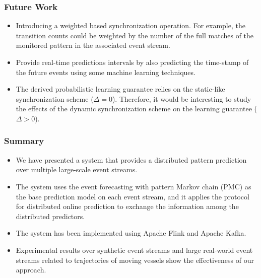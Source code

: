\begin{frame}
	
	\frametitle{Future Work}
	\begin{itemize}
		\item<1-> Introducing a weighted based synchronization operation. For example, the transition counts could be weighted by the number of the full matches of the monitored pattern in the associated event stream. 
		
		\item<1->Provide real-time predictions intervals by also predicting the time-stamp of the future events using some machine learning techniques.  
		
		\item<1->  The derived probabilistic learning guarantee  relies on the static-like synchronization scheme  ($\Delta=0$). Therefore, it would be interesting to study the effects of the dynamic synchronization scheme on the learning guarantee ($\Delta > 0$).
	\end{itemize}
	
\end{frame}

\begin{frame}
	
	\frametitle{Summary }
	\begin{itemize}
		\item<only@1> We have presented a system that provides a distributed pattern prediction over multiple large-scale event streams.
		
		\item<only@1> The system uses the event forecasting with pattern Markov chain (PMC) \cite{alevizos2017event} as the base prediction model on each event stream, and it applies the protocol for distributed online prediction \cite{kamp2014communication} to exchange the information among the distributed predictors.
		
		\item<only@2> The system has been implemented using Apache Flink and Apache Kafka.
		
		\item<only@2> Experimental results over synthetic event streams and large real-world event streams related to trajectories of moving vessels show the effectiveness of our approach.
		
	\end{itemize}
	
\end{frame}